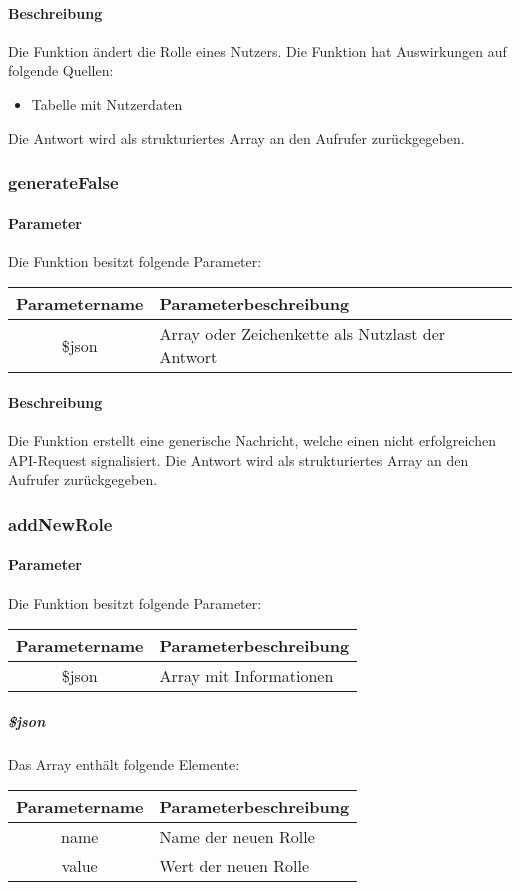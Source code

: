 \paragraph{Beschreibung} Die Funktion ändert die Rolle eines Nutzers. Die Funktion hat Auswirkungen auf folgende Quellen:
\begin{itemize}
	\item Tabelle mit Nutzerdaten
\end{itemize}
Die Antwort wird als strukturiertes Array an den Aufrufer zurückgegeben.
\subsubsection{generateFalse}
\paragraph{Parameter} Die Funktion besitzt folgende Parameter:
\begin{table}[H]
	\begin{tabular}{|c|p{11cm}|}
		\hline
		\textbf{Parametername} & \textbf{Parameterbeschreibung} \\ \hline
		\$json & Array oder Zeichenkette als Nutzlast der Antwort \\ \hline
	\end{tabular}
\end{table}
\paragraph{Beschreibung} Die Funktion erstellt eine generische Nachricht, welche einen nicht erfolgreichen API-Request signalisiert. Die Antwort wird als strukturiertes Array an den Aufrufer zurückgegeben.
\subsubsection{addNewRole}
\paragraph{Parameter} Die Funktion besitzt folgende Parameter:
\begin{table}[H]
	\begin{tabular}{|c|p{11cm}|}
		\hline
		\textbf{Parametername} & \textbf{Parameterbeschreibung} \\ \hline
		\$json & Array mit Informationen \\ \hline
	\end{tabular}
\end{table}
\subparagraph{\$json}Das Array enthält folgende Elemente:
\begin{table}[H]
	\begin{tabular}{|c|p{11cm}|}
		\hline
		\textbf{Parametername} & \textbf{Parameterbeschreibung} \\ \hline
		name  & Name der neuen Rolle \\ \hline
		value & Wert der neuen Rolle \\ \hline
	\end{tabular}
\end{table}
